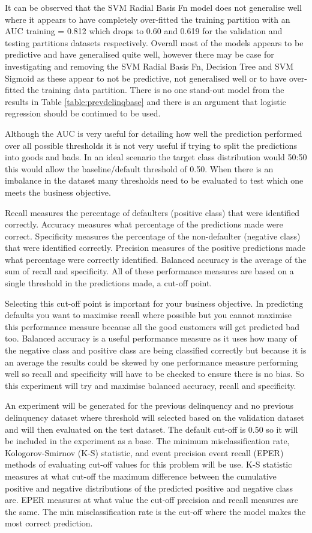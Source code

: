 It can be observed that the SVM Radial Basis Fn model does not generalise well where it appears to have completely over-fitted the training partition with an AUC training = 0.812 which drops to 0.60 and 0.619 for the validation and testing partitions datasets respectively. Overall most of the models appears to be predictive and have generalised quite well, however there may be case for investigating and removing the SVM Radial Basis Fn, Decision Tree and SVM Sigmoid as these appear to not be predictive, not generalised well or to have over-fitted the training data partition. There is no one stand-out model from the results in Table \ref{table:prevdelinqbase} and there is an argument that logistic regression should be continued to be used. 


Although the AUC is very useful for detailing how well the prediction performed over all possible thresholds it is not very useful if trying to split the predictions into goods and bads. In an ideal scenario the target class distribution would 50:50 this would allow the baseline/default threshold of 0.50. When there is an imbalance in the dataset many thresholds need to be evaluated to test which one meets the business objective.

Recall measures the percentage of defaulters (positive class) that were identified correctly. Accuracy measures what percentage of the predictions made were correct. Specificity measures the percentage of the non-defaulter (negative class) that were identified correctly. Precision measures of the positive predictions made what percentage were correctly identified. Balanced accuracy is the average of the sum of recall and specificity. All of these performance measures are based on a single threshold in the predictions made, a cut-off point.

Selecting this cut-off point is important for your business objective. In predicting defaults you want to maximise recall where possible but you cannot maximise this performance measure because all the good customers will get predicted bad too. Balanced accuracy is a useful performance measure as it uses how many of the negative class and positive class are being classified correctly but because it is an average the results could be skewed by one performance measure performing well so recall and specificity will have to be checked to ensure there is no bias. So this experiment will try and maximise balanced accuracy, recall and specificity.

An experiment will be generated for the previous delinquency and no previous delinquency dataset where threshold will selected based on the validation dataset and will then evaluated on the test dataset. The default cut-off is 0.50 so it will be included in the experiment as a base. The minimum misclassification rate, Kologorov-Smirnov (K-S) statistic, and event precision event recall (EPER) methods of evaluating cut-off values for this problem will be use.
K-S statistic measures at what cut-off the maximum difference between the cumulative positive and negative distributions of the predicted positive and negative class are. EPER measures at what value the cut-off precision and recall measures are the same. The min misclassification rate is the cut-off where the model makes the most correct prediction. 

